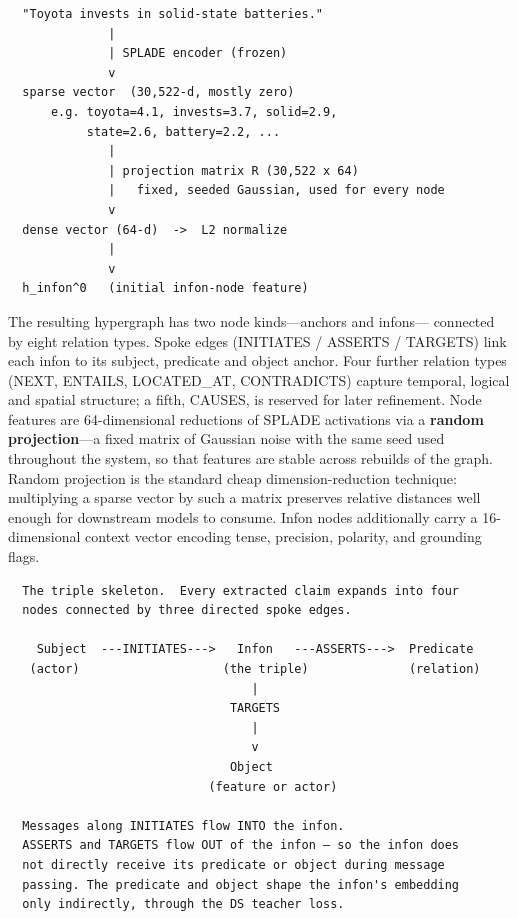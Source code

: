 \documentclass[11pt,a4paper]{article}
\begin{document}
\begin{verbatim}
  "Toyota invests in solid-state batteries."
              |
              | SPLADE encoder (frozen)
              v
  sparse vector  (30,522-d, mostly zero)
      e.g. toyota=4.1, invests=3.7, solid=2.9,
           state=2.6, battery=2.2, ...
              |
              | projection matrix R (30,522 x 64)
              |   fixed, seeded Gaussian, used for every node
              v
  dense vector (64-d)  ->  L2 normalize
              |
              v
  h_infon^0   (initial infon-node feature)
\end{verbatim}

The resulting hypergraph has two node kinds---anchors and infons---
connected by eight relation types. Spoke edges (INITIATES /
ASSERTS / TARGETS) link each infon to its subject, predicate and
object anchor. Four further relation types (NEXT, ENTAILS,
LOCATED\_AT, CONTRADICTS) capture temporal, logical and spatial
structure; a fifth, CAUSES, is reserved for later refinement.
Node features are 64-dimensional reductions of SPLADE activations
via a \textbf{random projection}---a fixed matrix of Gaussian
noise with the same seed used throughout the system, so that
features are stable across rebuilds of the graph. Random
projection is the standard cheap dimension-reduction technique:
multiplying a sparse vector by such a matrix preserves relative
distances well enough for downstream models to consume. Infon
nodes additionally carry a 16-dimensional context vector encoding
tense, precision, polarity, and grounding flags.

\begin{verbatim}
  The triple skeleton.  Every extracted claim expands into four
  nodes connected by three directed spoke edges.

    Subject  ---INITIATES--->   Infon   ---ASSERTS--->  Predicate
   (actor)                    (the triple)              (relation)
                                  |
                               TARGETS
                                  |
                                  v
                               Object
                            (feature or actor)

  Messages along INITIATES flow INTO the infon.
  ASSERTS and TARGETS flow OUT of the infon — so the infon does
  not directly receive its predicate or object during message
  passing. The predicate and object shape the infon's embedding
  only indirectly, through the DS teacher loss.
\end{verbatim}
\end{document}
